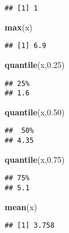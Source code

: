 \documentclass[
]{article}
\newenvironment{Shaded}{\begin{snugshade}}{\end{snugshade}}
\newcommand{\FloatTok}[1]{\textcolor[rgb]{0.00,0.00,0.81}{#1}}
\newcommand{\FunctionTok}[1]{\textcolor[rgb]{0.13,0.29,0.53}{\textbf{#1}}}
\newcommand{\NormalTok}[1]{#1}
\begin{document}
\begin{verbatim}
## [1] 1
\end{verbatim}

\begin{Shaded}
\begin{Highlighting}[]
\FunctionTok{max}\NormalTok{(x)}
\end{Highlighting}
\end{Shaded}

\begin{verbatim}
## [1] 6.9
\end{verbatim}

\begin{Shaded}
\begin{Highlighting}[]
\FunctionTok{quantile}\NormalTok{(x,}\FloatTok{0.25}\NormalTok{)}
\end{Highlighting}
\end{Shaded}

\begin{verbatim}
## 25% 
## 1.6
\end{verbatim}

\begin{Shaded}
\begin{Highlighting}[]
\FunctionTok{quantile}\NormalTok{(x,}\FloatTok{0.50}\NormalTok{)}
\end{Highlighting}
\end{Shaded}

\begin{verbatim}
##  50% 
## 4.35
\end{verbatim}

\begin{Shaded}
\begin{Highlighting}[]
\FunctionTok{quantile}\NormalTok{(x,}\FloatTok{0.75}\NormalTok{)}
\end{Highlighting}
\end{Shaded}

\begin{verbatim}
## 75% 
## 5.1
\end{verbatim}

\begin{Shaded}
\begin{Highlighting}[]
\FunctionTok{mean}\NormalTok{(x)}
\end{Highlighting}
\end{Shaded}

\begin{verbatim}
## [1] 3.758
\end{verbatim}
\end{document}
